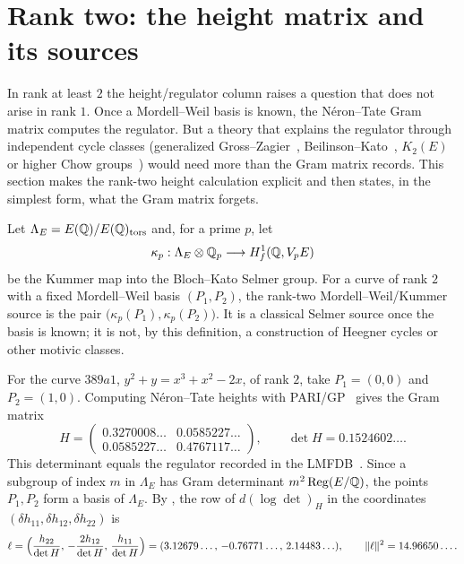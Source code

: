 \section{Rank two: the height matrix and its sources}
\label{sec:higher-rank-no-go}

In rank at least $2$ the height/regulator column raises a question that
does not arise in rank $1$.  Once a Mordell--Weil basis is known, the
N\'eron--Tate Gram matrix computes the regulator.  But a theory that
explains the regulator through independent cycle classes (generalized
Gross--Zagier~\citep{GrossZagier1986}, Beilinson--Kato~\citep{Beilinson1985,Kato2004},
$K_2(E)$ or higher Chow groups~\citep{Bloch1986}) would need more than the
Gram matrix records.  This section makes the rank-two height calculation
explicit and then states, in the simplest form, what the Gram matrix
forgets.

\begin{definition}\label{def:apparatus:rank-two-kummer-source}
Let $\Lambda_E=E(\mathbb{Q})/E(\mathbb{Q})_{\operatorname{tors}}$ and, for a prime $p$, let
\[
  \kappa_p:\Lambda_E\otimes\mathbb{Q}_p\longrightarrow H^1_f(\mathbb{Q},V_pE)
\]
be the Kummer map into the Bloch--Kato Selmer group.  For a curve of rank
$2$ with a fixed Mordell--Weil basis $(P_1,P_2)$, the rank-two
Mordell--Weil/Kummer source is the pair
$\bigl(\kappa_p(P_1),\kappa_p(P_2)\bigr)$.  It is a classical Selmer source
once the basis is known; it is not, by this definition, a construction of
Heegner cycles or other motivic classes.
\end{definition}

For the curve $389a1$, $y^2+y=x^3+x^2-2x$, of rank $2$, take
$P_1=(0,0)$ and $P_2=(1,0)$.  Computing N\'eron--Tate heights with
PARI/GP~\citep{PARI2023} gives the Gram matrix
\[
  H=\begin{pmatrix}0.3270008\ldots & 0.0585227\ldots\\
  0.0585227\ldots & 0.4767117\ldots\end{pmatrix},
  \qquad
  \det H=0.1524602\ldots .
\]
This determinant equals the regulator recorded in the LMFDB~\citep{LMFDB}.
Since a subgroup of index $m$ in $\Lambda_E$ has Gram determinant
$m^2\operatorname{Reg}(E/\mathbb{Q})$, the points $P_1,P_2$ form a basis of $\Lambda_E$.  By
, the row of
$d(\log\det)_H$ in the coordinates
$(\delta h_{11},\delta h_{12},\delta h_{22})$ is
\[
  \ell=\Bigl(\frac{h_{22}}{\det H},\,-\frac{2h_{12}}{\det H},\,
  \frac{h_{11}}{\det H}\Bigr)
  =(3.12679\ldots,\,-0.76771\ldots,\,2.14483\ldots),
  \qquad
  \|\ell\|^2=14.96650\ldots .
\]

